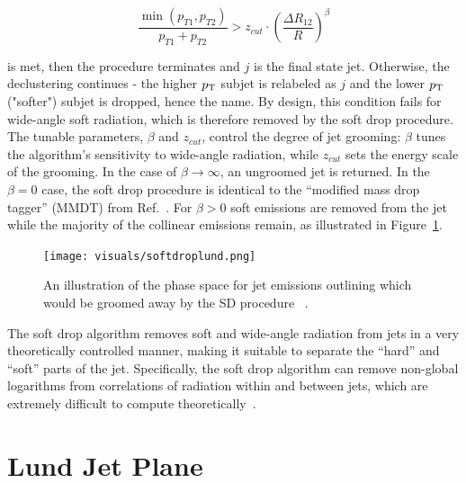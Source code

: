 \begin{equation}
  \frac{\min(p_{T1},p_{T2})}{p_{T1}+p_{T2}} > z_{cut} \cdot (\frac{\Delta R_{12}}{R})^\beta
\end{equation}

is met, then the procedure terminates and $j$ is the final state jet. Otherwise, the declustering continues - 
the higher $p_{\mathrm{T}}$ subjet is relabeled as $j$ and the lower $p_{\mathrm{T}}$ ("softer") subjet is dropped, hence the name.
By design, this condition fails for wide-angle soft radiation, which is therefore removed by the soft
drop procedure. The tunable parameters, $\beta$ and $z_{cut}$, control the degree of jet grooming:
$\beta$ tunes the algorithm's sensitivity to wide-angle radiation, while $z_{cut}$ sets the energy scale
of the grooming. In the case of $\beta \rightarrow \infty$, an ungroomed jet is returned. 
In the $\beta = 0$ case, the soft drop procedure is identical to the ``modified mass drop tagger'' (MMDT)
from Ref.~\cite{mmdt}. For $\beta > 0$  soft emissions are removed from the jet while the majority of the collinear emissions remain, as illustrated in Figure~\ref{fig:softdroplund}. 


\begin{figure}[htb]
\centering
\texttt{[image: visuals/softdroplund.png]}
\caption{An illustration of the phase space for jet emissions outlining which would be groomed away by the SD procedure ~\cite{softdrop}.}
\label{fig:softdroplund}
\end{figure}

The soft drop algorithm removes soft and wide-angle radiation
from jets in a very theoretically controlled manner, making it suitable to separate
the ``hard'' and ``soft'' parts of the jet. Specifically, the soft drop
algorithm can remove non-global logarithms from correlations of
radiation within and between jets, which are extremely difficult to
compute theoretically~\cite{Dasgupta:2001sh,mmdt,softdrop,Dasgupta:2013via,Dasgupta:2015yua,Larkoski:2015zka}.













\section{Lund Jet Plane}\label{sec:lundjetplane}



